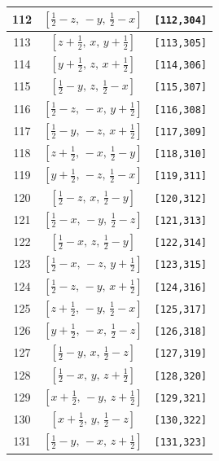 \documentclass[fleqn,8pt]{jsarticle}
\begin{document}
\begin{longtable}{ccc}
112 & $\left[ \frac{1}{2} - z,\, - y,\, \frac{1}{2} - x \right]$ & {\tt [112,304]} \\ \hline
113 & $\left[ z + \frac{1}{2},\, x,\, y + \frac{1}{2} \right]$ & {\tt [113,305]} \\ \hline
114 & $\left[ y + \frac{1}{2},\, z,\, x + \frac{1}{2} \right]$ & {\tt [114,306]} \\ \hline
115 & $\left[ \frac{1}{2} - y,\, z,\, \frac{1}{2} - x \right]$ & {\tt [115,307]} \\ \hline
116 & $\left[ \frac{1}{2} - z,\, - x,\, y + \frac{1}{2} \right]$ & {\tt [116,308]} \\ \hline
117 & $\left[ \frac{1}{2} - y,\, - z,\, x + \frac{1}{2} \right]$ & {\tt [117,309]} \\ \hline
118 & $\left[ z + \frac{1}{2},\, - x,\, \frac{1}{2} - y \right]$ & {\tt [118,310]} \\ \hline
119 & $\left[ y + \frac{1}{2},\, - z,\, \frac{1}{2} - x \right]$ & {\tt [119,311]} \\ \hline
120 & $\left[ \frac{1}{2} - z,\, x,\, \frac{1}{2} - y \right]$ & {\tt [120,312]} \\ \hline
121 & $\left[ \frac{1}{2} - x,\, - y,\, \frac{1}{2} - z \right]$ & {\tt [121,313]} \\ \hline
122 & $\left[ \frac{1}{2} - x,\, z,\, \frac{1}{2} - y \right]$ & {\tt [122,314]} \\ \hline
123 & $\left[ \frac{1}{2} - x,\, - z,\, y + \frac{1}{2} \right]$ & {\tt [123,315]} \\ \hline
124 & $\left[ \frac{1}{2} - z,\, - y,\, x + \frac{1}{2} \right]$ & {\tt [124,316]} \\ \hline
125 & $\left[ z + \frac{1}{2},\, - y,\, \frac{1}{2} - x \right]$ & {\tt [125,317]} \\ \hline
126 & $\left[ y + \frac{1}{2},\, - x,\, \frac{1}{2} - z \right]$ & {\tt [126,318]} \\ \hline
127 & $\left[ \frac{1}{2} - y,\, x,\, \frac{1}{2} - z \right]$ & {\tt [127,319]} \\ \hline
128 & $\left[ \frac{1}{2} - x,\, y,\, z + \frac{1}{2} \right]$ & {\tt [128,320]} \\ \hline
129 & $\left[ x + \frac{1}{2},\, - y,\, z + \frac{1}{2} \right]$ & {\tt [129,321]} \\ \hline
130 & $\left[ x + \frac{1}{2},\, y,\, \frac{1}{2} - z \right]$ & {\tt [130,322]} \\ \hline
131 & $\left[ \frac{1}{2} - y,\, - x,\, z + \frac{1}{2} \right]$ & {\tt [131,323]} \\ \hline

\end{longtable}
\end{document}
